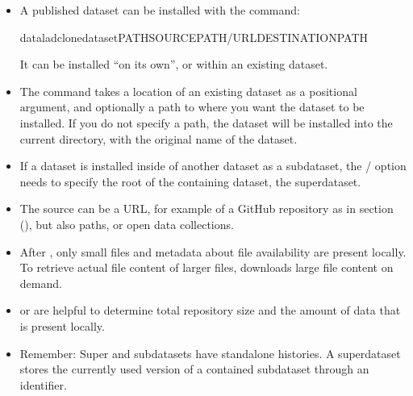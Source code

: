 \ignorespaces \begin{itemize}
\item {} 
\sphinxAtStartPar
A published dataset can be installed with the  command:

\begin{sphinxVerbatim}[commandchars=\\\{\}]
dataladclone\PYG{o}{[}\PYGZhy{}\PYGZhy{}datasetPATH\PYG{o}{]}SOURCE\PYGZhy{}PATH/URL\PYG{o}{[}DESTINATIONPATH\PYG{o}{]}
\end{sphinxVerbatim}

\sphinxAtStartPar
It can be installed “on its own”, or within an existing dataset.

\item {} 
\sphinxAtStartPar
The command takes a location of an existing dataset as a positional argument,
and optionally a path to where you want the dataset to be installed. If you do not specify a path,
the dataset will be installed into the current directory, with the original name of the
dataset.

\item {} 
\sphinxAtStartPar
If a dataset is installed inside of another dataset as a subdataset, the
/ option needs to specify the root of the containing dataset, the superdataset.

\item {} 
\sphinxAtStartPar
The source can be a URL, for example of a GitHub repository as in section {\hyperref[\detokenize{basics/101-105-install:installds}]{}} (), but also
paths, or open data collections.

\item {} 
\sphinxAtStartPar
After , only small files and metadata about file availability are present locally.
To retrieve actual file content of larger files,  downloads large file
content on demand.

\item {} 
\sphinxAtStartPar
{} or  are helpful to determine
total repository size and the amount of data that is present locally.

\item {} 
\sphinxAtStartPar
Remember: Super\sphinxhyphen{} and subdatasets have standalone histories. A superdataset stores the currently used
version of a contained subdataset through an identifier.

\end{itemize}


